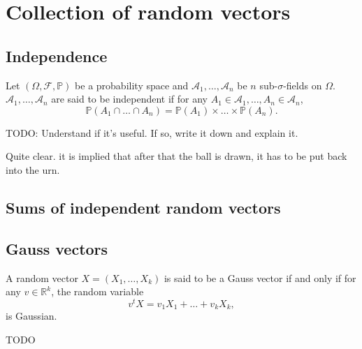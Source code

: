 \chapter{Collection of random vectors}%
\label{cha:Collection of random vectors}

\section{Independence}%
\label{sec:Independence}

\begin{definition}
    \label{def:11.1}
    Let $(\Omega, \mathcal{F}, \mathbb{P})$ be a probability space and $\mathcal{A}_1, \ldots,
    \mathcal{A}_n$ be $n$ sub-$\sigma$-fields on $\Omega$. $\mathcal{A}_1, \ldots, \mathcal{A}_n$
    are said to be independent if for any $A_1 \in \mathcal{A}_1, \ldots, A_n \in \mathcal{A}_n$,
    \[
    \mathbb{P}(A_1 \cap \ldots \cap A_n) = \mathbb{P}(A_1)\times \ldots \times \mathbb{P}(A_n)
    .\] 
\end{definition}

\begin{definition}[]
    \label{def:11.2}
    TODO: Understand if it's useful. If so, write it down and explain it.
\end{definition}

\begin{example}[]
    \label{ex:11.1}
    Quite clear. it is implied that after that the ball is drawn, it has to be put back into
    the urn.
\end{example}

\section{Sums of independent random vectors}%
\label{sec:Sums of independent random vectors}

\section{Gauss vectors}%
\label{sec:Gauss vectors}
\begin{definition}
    \label{def:11.6}
    A random vector $X=(X_1, \ldots, X_k)$ is said to be a Gauss vector if and only if for any 
    $v \in \mathbb{R}^{k}$, the random variable
    \[
    v^{t}X = v_1X_1 + \ldots + v_kX_k,
    \] 
    is Gaussian.
\end{definition}

\begin{remark}[]
    \label{rem:11.11}
    TODO
\end{remark}


